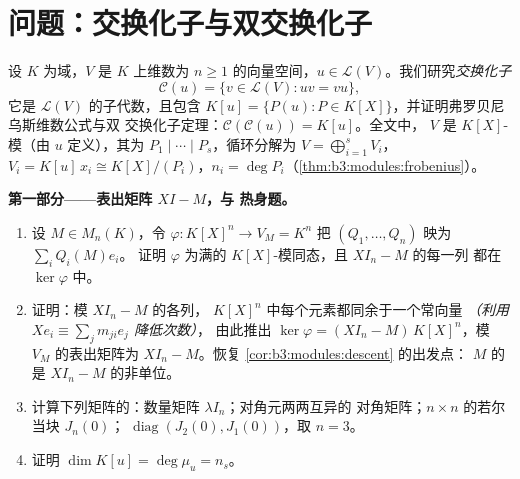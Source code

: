 \section{问题：交换化子与双交换化子}

\begin{problem}\label{pb:b3:modules:1}
设 $K$ 为域，$V$ 是 $K$ 上维数为 $n \geq
1$ 的向量空间，$u \in \mathcal L(V)$。我们研究\emph{交换化子}
\[
\mathcal C(u) = \{v \in \mathcal L(V) : uv = vu\},
\]
它是 $\mathcal L(V)$ 的子代数，且包含 $K[u] = \{P(u) : P \in
K[X]\}$，并证明弗罗贝尼乌斯维数公式与双
交换化子定理：$\mathcal C(\mathcal C(u)) = K[u]$。全文中，
$V$ 是 $K[X]$-模（由 $u$ 定义），其为
$P_1 \mid \cdots \mid P_s$，循环分解为 $V =
\bigoplus_{i=1}^s V_i$，$V_i = K[u]\,x_i \cong K[X]/(P_i)$，$n_i
= \deg P_i$（\cref{thm:b3:modules:frobenius}）。

\medskip
\noindent\textbf{第一部分——表出矩阵 $XI - M$，与
热身题。}
\begin{enumerate}
  \item 设 $M \in M_n(K)$，令 $\varphi \colon K[X]^n \to V_M
        = K^n$ 把 $(Q_1, \dots, Q_n)$ 映为 $\sum_i Q_i(M)e_i$。
        证明 $\varphi$ 为满的
        $K[X]$-模同态，且 $XI_n - M$ 的每一列
        都在 $\ker\varphi$ 中。
  \item 证明：模 $XI_n - M$ 的各列，
        $K[X]^n$ 中每个元素都同余于一个常向量
        \emph{（利用 $Xe_i \equiv \sum_j m_{ji}e_j$ 降低次数）}，
        由此推出 $\ker\varphi = (XI_n - M)\,K[X]^n$，模
        $V_M$ 的表出矩阵为 $XI_n - M$。恢复
        \cref{cor:b3:modules:descent} 的出发点：
        $M$ 的是
        $XI_n - M$ 的非单位。
  \item 计算下列矩阵的：数量矩阵
        $\lambda I_n$；对角元两两互异的
        对角矩阵；$n \times n$ 的若尔当块 $J_n(0)$；
        $\operatorname{diag}(J_2(0), J_1(0))$，取 $n = 3$。
  \item 证明 $\dim K[u] = \deg \mu_u = n_s$。
\end{enumerate}


\end{problem}
